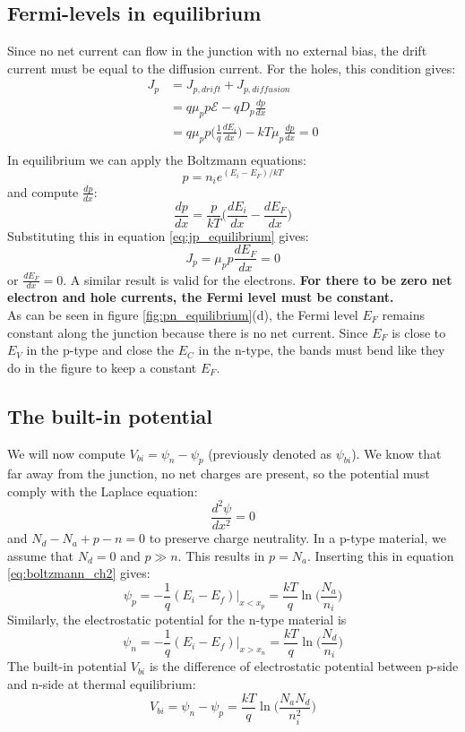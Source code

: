\subsection{Fermi-levels in equilibrium}
Since no net current can flow in the junction with no external bias, the drift current must be equal to the diffusion current. For the holes, this condition gives:
\begin{equation}
    \begin{split}
       J_p  &= J_{p, drift} + J_{p, diffusion} \\
            &= q \mu_p p \mathcal{E} - q D_p \frac{dp}{dx} \\
            &= q \mu_p p \Big(\frac{1}{q} \frac{dE_i}{dx} \Big) - k T \mu_p \frac{dp}{dx}  = 0\\
    \end{split}
    \label{eq:jp_equilibrium}
\end{equation}
In equilibrium we can apply the Boltzmann equations: 
\begin{equation}
    p = n_i e^{(E_i - E_F)/kT}
    \label{eq:boltzmann_ch2}
\end{equation}
and compute $\frac{dp}{dx}$:
$$
\frac{dp}{dx} = \frac{p}{kT} \Big( \frac{dE_i}{dx} - \frac{dE_F}{dx} \Big)
$$
Substituting this in equation \ref{eq:jp_equilibrium} gives:
$$
J_p = \mu_p p \frac{dE_F}{dx} = 0 
$$
or $\frac{dE_F}{dx} = 0$. A similar result is valid for the electrons. \textbf{For there to be zero net electron and hole currents, the Fermi level must be constant.}\\
As can be seen in figure \ref{fig:pn_equilibrium}(d), the Fermi level $E_F$ remains constant along the junction because there is no net current. Since $E_F$ is close to $E_V$ in the p-type and close the $E_C$ in the n-type, the bands must bend like they do  in the figure to keep a constant $E_F$.

\subsection{The built-in potential}
We will now compute $V_{bi} = \psi_n - \psi_p$ (previously denoted as $\psi_{bi}$). We know that far away from the junction, no net charges are present, so the potential must comply with the Laplace equation:
$$
\frac{d^2 \psi}{dx^2} = 0
$$
and $N_d - N_a + p - n = 0$ to preserve charge neutrality. In a p-type material, we assume that $N_d = 0$ and $p \gg n$. This results in $p = N_a$. Inserting this in equation \ref{eq:boltzmann_ch2} gives:
$$
\psi_p = -\frac{1}{q} (E_i - E_f) |_{x < x_p} = \frac{kT}{q} \ln\Big(\frac{N_a}{n_i}\Big)
$$
Similarly, the electrostatic potential for the n-type material is
$$
\psi_n = -\frac{1}{q} (E_i - E_f) |_{x > x_n} = \frac{kT}{q} \ln\Big(\frac{N_d}{n_i}\Big)
$$
The built-in potential $V_{bi}$ is the difference of electrostatic potential between p-side and n-side at thermal equilibrium:
\begin{equation}
    V_{bi} = \psi_n - \psi_p = \frac{kT}{q} \ln\Big(\frac{N_a N_d}{n_i^2}\Big)
    \label{eq:vbi}
\end{equation}

